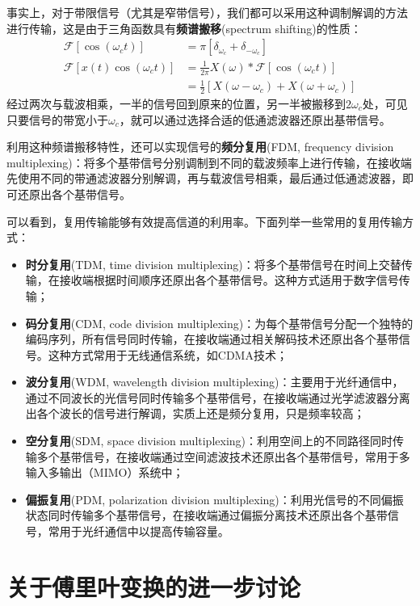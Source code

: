 \documentclass{ctexbook}
\begin{document}
事实上，对于带限信号（尤其是窄带信号），我们都可以采用这种调制解调的方法进行传输，这是由于三角函数具有\textbf{频谱搬移}(spectrum shifting)的性质：\begin{align*}
    \mathcal{F} \left[\cos(\omega_c t)\right]&=\pi\left[\delta_{\omega_c}+\delta_{-\omega_c}\right]\\
    \mathcal{F}\left[x(t)\cos(\omega_c t)\right]&=\frac{1}{2\pi}X(\omega)*\mathcal{F}\left[\cos(\omega_c t)\right]\\
    &=\frac{1}{2}\left[X(\omega-\omega_c)+X(\omega+\omega_c)\right]
\end{align*}
经过两次与载波相乘，一半的信号回到原来的位置，另一半被搬移到$2\omega_c$处，可见只要信号的带宽小于$\omega_c$，就可以通过选择合适的低通滤波器还原出基带信号。

利用这种频谱搬移特性，还可以实现信号的\textbf{频分复用}(FDM, frequency division multiplexing)：将多个基带信号分别调制到不同的载波频率上进行传输，在接收端先使用不同的带通滤波器分别解调，再与载波信号相乘，最后通过低通滤波器，即可还原出各个基带信号。

可以看到，复用传输能够有效提高信道的利用率。下面列举一些常用的复用传输方式：\begin{itemize}
    \item \textbf{时分复用}(TDM, time division multiplexing)：将多个基带信号在时间上交替传输，在接收端根据时间顺序还原出各个基带信号。这种方式适用于数字信号传输；
    \item \textbf{码分复用}(CDM, code division multiplexing)：为每个基带信号分配一个独特的编码序列，所有信号同时传输，在接收端通过相关解码技术还原出各个基带信号。这种方式常用于无线通信系统，如CDMA技术；
    \item \textbf{波分复用}(WDM, wavelength division multiplexing)：主要用于光纤通信中，通过不同波长的光信号同时传输多个基带信号，在接收端通过光学滤波器分离出各个波长的信号进行解调，实质上还是频分复用，只是频率较高；
    \item \textbf{空分复用}(SDM, space division multiplexing)：利用空间上的不同路径同时传输多个基带信号，在接收端通过空间滤波技术还原出各个基带信号，常用于多输入多输出（MIMO）系统中；
    \item \textbf{偏振复用}(PDM, polarization division multiplexing)：利用光信号的不同偏振状态同时传输多个基带信号，在接收端通过偏振分离技术还原出各个基带信号，常用于光纤通信中以提高传输容量。
\end{itemize}

\chapter{关于傅里叶变换的进一步讨论}
\end{document}
